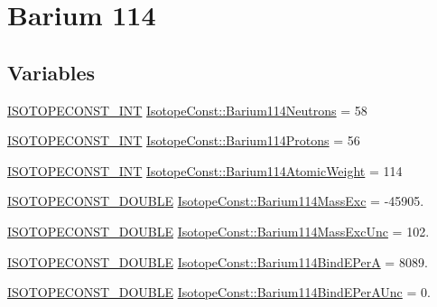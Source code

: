 \hypertarget{group___isotope_const-_barium-_ba114}{}\section{Barium 114}
\label{group___isotope_const-_barium-_ba114}
\subsection*{Variables}
\begin{DoxyCompactItemize}
\item 
\mbox{\hyperlink{group___isotope_const-_macros_ga5f18360b3e99483a35c32d789e62621c}{I\+S\+O\+T\+O\+P\+E\+C\+O\+N\+S\+T\+\_\+\+I\+NT}} \mbox{\hyperlink{group___isotope_const-_barium-_ba114_ga31cc93361b04442d69d8ddabb2f16b36}{Isotope\+Const\+::\+Barium114\+Neutrons}} = 58
\item 
\mbox{\hyperlink{group___isotope_const-_macros_ga5f18360b3e99483a35c32d789e62621c}{I\+S\+O\+T\+O\+P\+E\+C\+O\+N\+S\+T\+\_\+\+I\+NT}} \mbox{\hyperlink{group___isotope_const-_barium-_ba114_ga2bcaf1f915474709f0abc53e60bd5f71}{Isotope\+Const\+::\+Barium114\+Protons}} = 56
\item 
\mbox{\hyperlink{group___isotope_const-_macros_ga5f18360b3e99483a35c32d789e62621c}{I\+S\+O\+T\+O\+P\+E\+C\+O\+N\+S\+T\+\_\+\+I\+NT}} \mbox{\hyperlink{group___isotope_const-_barium-_ba114_ga9421463f160f3cc3bf5d8f90370a4f3c}{Isotope\+Const\+::\+Barium114\+Atomic\+Weight}} = 114
\item 
\mbox{\hyperlink{group___isotope_const-_macros_ga8f45a7272ce02c0b4c65c44636ed719a}{I\+S\+O\+T\+O\+P\+E\+C\+O\+N\+S\+T\+\_\+\+D\+O\+U\+B\+LE}} \mbox{\hyperlink{group___isotope_const-_barium-_ba114_gadb424b175442ad4303584281b01241b1}{Isotope\+Const\+::\+Barium114\+Mass\+Exc}} = -\/45905.
\item 
\mbox{\hyperlink{group___isotope_const-_macros_ga8f45a7272ce02c0b4c65c44636ed719a}{I\+S\+O\+T\+O\+P\+E\+C\+O\+N\+S\+T\+\_\+\+D\+O\+U\+B\+LE}} \mbox{\hyperlink{group___isotope_const-_barium-_ba114_gac017ee1e69bc46c9c6d596d16c590be5}{Isotope\+Const\+::\+Barium114\+Mass\+Exc\+Unc}} = 102.
\item 
\mbox{\hyperlink{group___isotope_const-_macros_ga8f45a7272ce02c0b4c65c44636ed719a}{I\+S\+O\+T\+O\+P\+E\+C\+O\+N\+S\+T\+\_\+\+D\+O\+U\+B\+LE}} \mbox{\hyperlink{group___isotope_const-_barium-_ba114_ga8173cbeb4e5d17dceb558f2589cdb2ec}{Isotope\+Const\+::\+Barium114\+Bind\+E\+PerA}} = 8089.
\item 
\mbox{\hyperlink{group___isotope_const-_macros_ga8f45a7272ce02c0b4c65c44636ed719a}{I\+S\+O\+T\+O\+P\+E\+C\+O\+N\+S\+T\+\_\+\+D\+O\+U\+B\+LE}} \mbox{\hyperlink{group___isotope_const-_barium-_ba114_gaae1223b5f476292bfdd1314dafb8e00b}{Isotope\+Const\+::\+Barium114\+Bind\+E\+Per\+A\+Unc}} = 0.

\end{DoxyCompactItemize}
